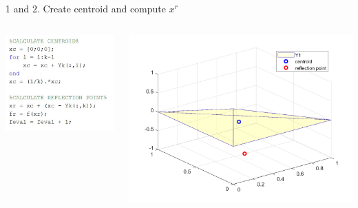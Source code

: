 \documentclass{beamer}
\begin{document}
\begin{frame}{1 and 2. Create centroid and compute $x^r$}
	\begin{columns}
	\begin{column}{0.35\linewidth}
		\centering
		\includegraphics[width=0.95\linewidth]{Order2}
	\end{column}
	\begin{column}{0.59\linewidth}
		\centering
		\includegraphics[width=0.95\linewidth]{Order2Fig}
	\end{column}
	\end{columns}
\end{frame}
\end{document}

